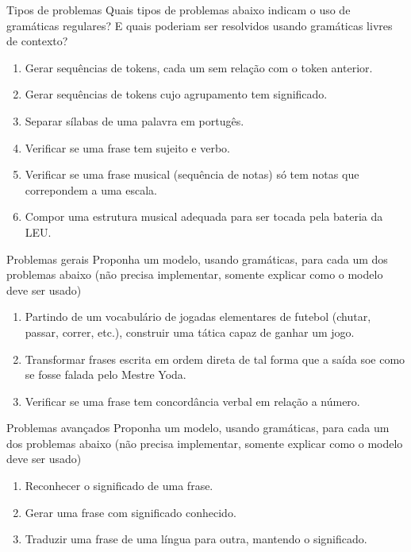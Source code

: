 \documentclass{beamer}
\begin{document}
\begin{frame}{Tipos de problemas}
\large
  Quais tipos de problemas abaixo indicam o uso de gramáticas regulares? E quais
  poderiam ser resolvidos usando gramáticas livres de contexto?
  \begin{enumerate}
    \item Gerar sequências de tokens, cada um sem relação com o token anterior.
    \item Gerar sequências de tokens cujo agrupamento tem significado.
    \item Separar sílabas de uma palavra em portugês.
    \item Verificar se uma frase tem sujeito e verbo.
    \item Verificar se uma frase musical (sequência de notas) só tem notas que
      correpondem a uma escala.
    \item Compor uma estrutura musical adequada para ser tocada pela bateria da
      LEU.
  \end{enumerate}
\end{frame}

\begin{frame}{Problemas gerais}
\large
  Proponha um modelo, usando gramáticas, para cada um dos problemas abaixo (não
  precisa implementar, somente explicar como o modelo deve ser usado)
  \begin{enumerate}
    \item Partindo de um vocabulário de jogadas elementares de futebol (chutar,
      passar, correr, etc.), construir uma tática capaz de ganhar um jogo.
    \item Transformar frases escrita em ordem direta de tal forma que a saída
      soe como se fosse falada pelo Mestre Yoda.
    \item Verificar se uma frase tem concordância verbal em relação a número.
  \end{enumerate}
\end{frame}

\begin{frame}{Problemas avançados}
\large
  Proponha um modelo, usando gramáticas, para cada um dos problemas abaixo (não
  precisa implementar, somente explicar como o modelo deve ser usado)
  \begin{enumerate}
    \item Reconhecer o significado de uma frase.
    \item Gerar uma frase com significado conhecido.
    \item Traduzir uma frase de uma língua para outra, mantendo o significado.
  \end{enumerate}
\end{frame}
\end{document}
